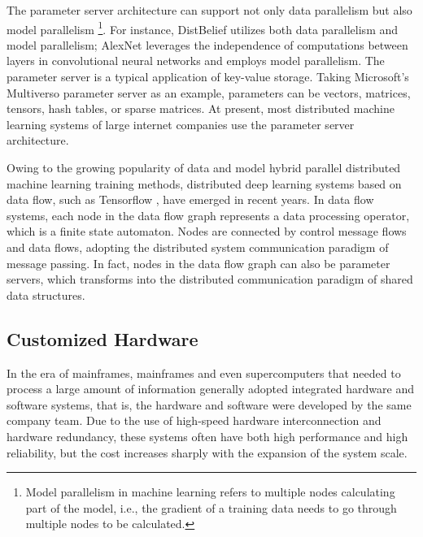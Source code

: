 The parameter server architecture can support not only data parallelism but also model parallelism \footnote{Model parallelism in machine learning refers to multiple nodes calculating part of the model, i.e., the gradient of a training data needs to go through multiple nodes to be calculated.}. For instance, DistBelief \cite{dean2012large} utilizes both data parallelism and model parallelism; AlexNet \cite{krizhevsky2012imagenet} leverages the independence of computations between layers in convolutional neural networks and employs model parallelism. The parameter server is a typical application of key-value storage. Taking Microsoft's Multiverso parameter server \cite{multiverso} as an example, parameters can be vectors, matrices, tensors, hash tables, or sparse matrices. At present, most distributed machine learning systems of large internet companies use the parameter server architecture.

Owing to the growing popularity of data and model hybrid parallel distributed machine learning training methods, distributed deep learning systems based on data flow, such as Tensorflow \cite{abadi2016tensorflow}, have emerged in recent years. In data flow systems, each node in the data flow graph represents a data processing operator, which is a finite state automaton. Nodes are connected by control message flows and data flows, adopting the distributed system communication paradigm of message passing. In fact, nodes in the data flow graph can also be parameter servers, which transforms into the distributed communication paradigm of shared data structures.

\subsection{Customized Hardware}
\label{background:sec:datacenter-customized}

In the era of mainframes, mainframes and even supercomputers that needed to process a large amount of information generally adopted integrated hardware and software systems, that is, the hardware and software were developed by the same company team. Due to the use of high-speed hardware interconnection and hardware redundancy, these systems often have both high performance and high reliability, but the cost increases sharply with the expansion of the system scale.

